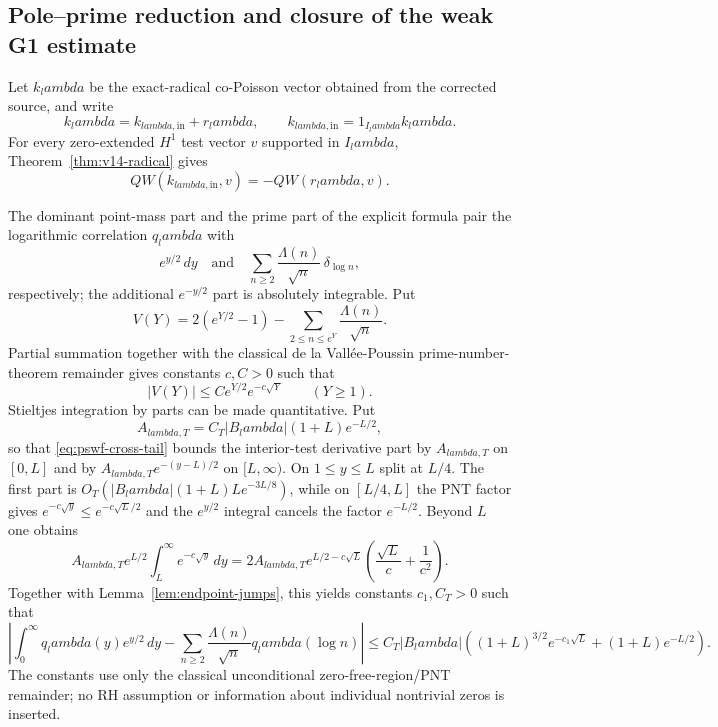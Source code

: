 \documentclass[11pt]{article}
\def\lambda{lambda}%
\theoremstyle{remark}
\begin{document}
\subsection{Pole--prime reduction and closure of the weak G1 estimate}
Let $k_\lambda$ be the exact-radical co-Poisson vector obtained from the corrected source, and write
\[
 k_\lambda=k_{\lambda,\mathrm{in}}+r_\lambda,
 \qquad k_{\lambda,\mathrm{in}}=1_{I_\lambda}k_\lambda.
\]
For every zero-extended $H^1$ test vector $v$ supported in $I_\lambda$,
Theorem~\ref{thm:v14-radical} gives
\begin{equation}\label{eq:radical-truncation}
 QW(k_{\lambda,\mathrm{in}},v)=-QW(r_\lambda,v).
\end{equation}

The dominant point-mass part and the prime part of the explicit formula pair the logarithmic correlation $q_\lambda$ with
\[
 e^{y/2}\,dy
 \quad\text{and}\quad
 \sum_{n\ge2}\frac{\Lambda(n)}{\sqrt n}\,\delta_{\log n},
\]
respectively; the additional $e^{-y/2}$ part is absolutely integrable.  Put
\[
 V(Y)=2(e^{Y/2}-1)-\sum_{2\le n\le e^Y}\frac{\Lambda(n)}{\sqrt n}.
\]
Partial summation together with the classical de la Vall\'ee-Poussin prime-number-theorem remainder gives constants $c,C>0$ such that
\begin{equation}\label{eq:centered-prime-cumulative}
 |V(Y)|\le C e^{Y/2}e^{-c\sqrt Y}\qquad(Y\ge1).
\end{equation}
Stieltjes integration by parts can be made quantitative.  Put
\[
 A_{\lambda,T}=C_T|B_\lambda|(1+L)e^{-L/2},
\]
so that \eqref{eq:pswf-cross-tail} bounds the interior-test derivative part by
$A_{\lambda,T}$ on $[0,L]$ and by
$A_{\lambda,T}e^{-(y-L)/2}$ on $[L,\infty)$.  On $1\le y\le L$ split at
$L/4$.  The first part is
$O_T(|B_\lambda|(1+L)L e^{-3L/8})$, while on $[L/4,L]$ the PNT factor gives
$e^{-c\sqrt y}\le e^{-c\sqrt L/2}$ and the $e^{y/2}$ integral cancels the
factor $e^{-L/2}$.  Beyond $L$ one obtains
\[
 A_{\lambda,T}e^{L/2}\int_L^\infty e^{-c\sqrt y}\,dy
 =2A_{\lambda,T}e^{L/2-c\sqrt L}
 \left(\frac{\sqrt L}{c}+\frac1{c^2}\right).
\]
Together with Lemma~\ref{lem:endpoint-jumps}, this yields constants
$c_1,C_T>0$ such that
\begin{equation}\label{eq:pole-prime-small}
 \left|\int_0^\infty q_\lambda(y)e^{y/2}\,dy
 -\sum_{n\ge2}\frac{\Lambda(n)}{\sqrt n}q_\lambda(\log n)\right|
 \le C_T|B_\lambda|\left((1+L)^{3/2}e^{-c_1\sqrt L}
 +(1+L)e^{-L/2}\right).
\end{equation}
The constants use only the classical unconditional zero-free-region/PNT remainder; no
RH assumption or information about individual nontrivial zeros is inserted.
\end{document}
